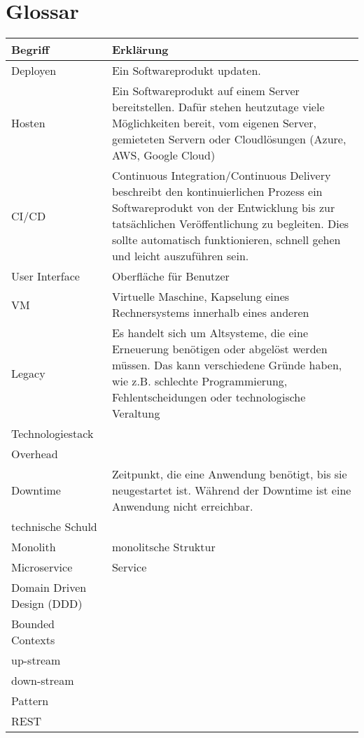 \section{Glossar}
\begin{center}
	\begin{tabular}{lp{10cm}}
		Begriff & Erklärung \\ \hline
		Deployen & Ein Softwareprodukt updaten.  \\
		Hosten & Ein Softwareprodukt auf einem Server bereitstellen. Dafür stehen heutzutage viele Möglichkeiten bereit, vom eigenen Server, gemieteten Servern oder Cloudlösungen (Azure, AWS, Google Cloud) \\
		CI/CD & Continuous Integration/Continuous Delivery beschreibt den kontinuierlichen Prozess ein Softwareprodukt von der Entwicklung bis zur tatsächlichen Veröffentlichung zu begleiten. Dies sollte automatisch funktionieren, schnell gehen und leicht auszuführen sein.  \\
		User Interface  & Oberfläche für Benutzer  \\
		VM & Virtuelle Maschine, Kapselung eines Rechnersystems innerhalb eines anderen  \\
		Legacy & Es handelt sich um Altsysteme, die eine Erneuerung benötigen oder abgelöst werden müssen. Das kann verschiedene Gründe haben, wie z.B. schlechte Programmierung, Fehlentscheidungen oder technologische Veraltung   \\
		Technologiestack &   \\
		Overhead &   \\
		Downtime & Zeitpunkt, die eine Anwendung benötigt, bis sie neugestartet ist. Während der Downtime ist eine Anwendung nicht erreichbar.  \\
		technische Schuld &   \\
		Monolith & monolitsche Struktur \\
		Microservice & Service  \\	
		Domain Driven Design (DDD) &  \\	
		Bounded Contexts & \\
		up-stream & \\
		down-stream & \\
		Pattern & \\
		REST & \\
	\end{tabular}
\end{center}
